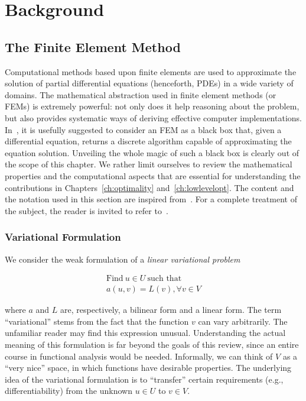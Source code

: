 \chapter{Background}

\section{The Finite Element Method}
\label{sec:bkg:fem}
Computational methods based upon finite elements are used to approximate the solution of partial differential equations (henceforth, PDEs) in a wide variety of domains. The mathematical abstraction used in finite element methods (or FEMs) is extremely powerful: not only does it help reasoning about the problem, but also provides systematic ways of deriving effective computer implementations. In~\cite{brenner-and-scott}, it is usefully suggested to consider an FEM as a black box that, given a differential equation, returns a discrete algorithm capable of approximating the equation solution. Unveiling the whole magic of such a black box is clearly out of the scope of this chapter. We rather limit ourselves to review the mathematical properties and the computational aspects that are essential for understanding the contributions in Chapters~\ref{ch:optimality} and~\ref{ch:lowlevelopt}. The content and the notation used in this section are inspired from~\cite{florian-thesis,kirby-and-logg,olgaard-and-wells}. For a complete treatment of the subject, the reader is invited to refer to~\cite{brenner-and-scott}.



\subsection{Variational Formulation}
\label{sec:bkg:var-problems}
We consider the weak formulation of a {\em linear variational problem}

\begin{equation}
\begin{split}
\text{Find}\ u \in U\ \text{such that} \\
a(u, v) = L(v), \forall v \in V
\end{split}
\end{equation}

where $a$ and $L$ are, respectively, a bilinear form and a linear form. The term ``variational'' stems from the fact that the function $v$ can vary arbitrarily. The unfamiliar reader may find this expression unusual. Understanding the actual meaning of this formulation is far beyond the goals of this review, since an entire course in functional analysis would be needed. Informally, we can think of $V$ as a ``very nice'' space, in which functions have desirable properties. The underlying idea of the variational formulation is to ``transfer'' certain requirements (e.g., differentiability) from the unknown $u \in U$ to $v \in V$.

